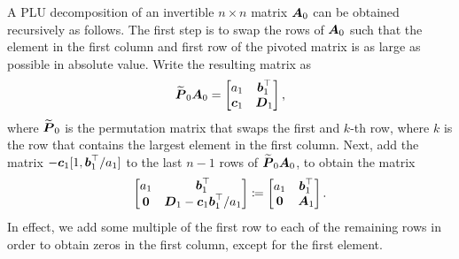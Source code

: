 A PLU decomposition of an invertible \(n \times n\) matrix \(\boldsymbol{A}_0\) can be obtained recursively as follows. The first step is to swap the rows of \(\boldsymbol{A}_0\) such that the element in the first column and first row of the pivoted matrix is as large as possible in absolute value. Write the resulting matrix as
\begin{equation*}
	\widetilde{\boldsymbol{P}}_0 \boldsymbol{A}_0 =
	\begin{bmatrix}
		a_1        & \boldsymbol{b}_1^\top \\
		\boldsymbol{c}_1 & \boldsymbol{D}_1
	\end{bmatrix},
\end{equation*}
where \(\widetilde{\boldsymbol{P}}_0\) is the permutation matrix that swaps the first and \(k\)-th row, where \(k\) is the row that contains the largest element in the first column. Next, add the matrix \(-\boldsymbol{c}_1 [1, \boldsymbol{b}_1^\top / a_1]\) to the last \(n-1\) rows of \(\widetilde{\boldsymbol{P}}_0 \boldsymbol{A}_0\), to obtain the matrix
\begin{equation*}
	\begin{bmatrix}
		a_1      & \boldsymbol{b}_1^\top                               \\
		\boldsymbol{0} & \boldsymbol{D}_1 - \boldsymbol{c}_1 \boldsymbol{b}_1^\top / a_1
	\end{bmatrix}
	\coloneqq
	\begin{bmatrix}
		a_1      & \boldsymbol{b}_1^\top \\
		\boldsymbol{0} & \boldsymbol{A}_1
	\end{bmatrix}.
\end{equation*}
In effect, we add some multiple of the first row to each of the remaining rows in order to obtain zeros in the first column, except for the first element.

